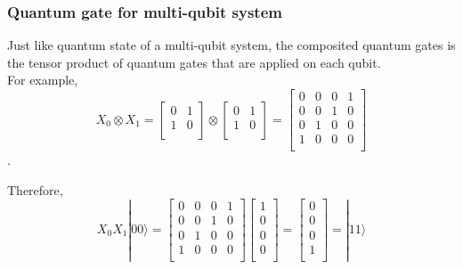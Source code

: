 \subsubsection{Quantum gate for multi-qubit system}

Just like quantum state of a multi-qubit system, the composited quantum gates is the tensor product of quantum gates that are applied on each qubit.  \\For example, 
\begin{equation}
X_0 \otimes X_1 = 
\begin{bmatrix}
0 & 1 \\
1 & 0 \\
\end{bmatrix}
\otimes
 \begin{bmatrix}
0 & 1 \\
1 & 0 \\
\end{bmatrix}
=  \begin{bmatrix}
0 & 0 & 0 & 1 \\
0 & 0 & 1 & 0 \\
0 & 1 & 0 & 0 \\
1 & 0 & 0 & 0 \\
\end{bmatrix}
\end{equation}.

Therefore, 
\begin{equation}
 X_0X_1 |00\rangle = 
\begin{bmatrix}
0 & 0 & 0 & 1 \\
0 & 0 & 1 & 0 \\
0 & 1 & 0 & 0 \\
1 & 0 & 0 & 0 \\
\end{bmatrix}
\left[
\begin{array}{c}
1 \\
0 \\
0 \\
0 \\
\end{array}
\right] 
= \left[
\begin{array}{c}
0 \\
0 \\
0 \\
1 \\
\end{array}
\right] 
= |11\rangle
\end{equation}

